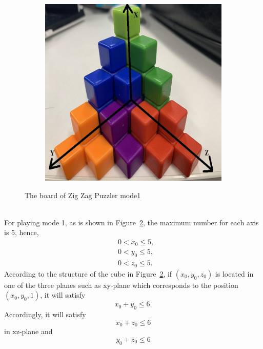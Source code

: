 \begin{figure}[htbp]
\begin{subfigure}[b]{.45\textwidth}
\includegraphics[width=\textwidth]{figs/3Dboard1.jpg}
\caption{}
\label{figure:mode1B}
\end{subfigure}
\caption{The board of Zig Zag Puzzler mode1}
  \label{fig:board1}
\end{figure}
\\For playing mode 1, as is shown in Figure~\ref{fig:board1}, the maximum number for each axis is 5, hence,
\begin{equation}
\begin{aligned}
&0<x_{0}\leq5,\\
&0<y_{0}\leq5,\\
&0<z_{0}\leq5.
\end{aligned}
\end{equation}
According to the structure of the cube in Figure~\ref{fig:board1}, if $(x_{0},y_{0},z_{0})$ is located in one of the three planes such as xy-plane which corresponds to the position $(x_{0},y_{0},1)$, it will satisfy
\begin{equation}
x_{0}+y_{0}\leq6.
\end{equation}
Accordingly, it will satisfy 
\begin{equation}
x_{0}+z_{0}\leq6
\end{equation}
in xz-plane and 
\begin{equation}
y_{0}+z_{0}\leq6
\end{equation}

